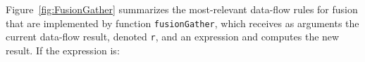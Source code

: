 \documentclass{sigplanconf}  %
\newcommand{\emp}[1]{\textcolor{DikuRed}{ #1}}
\newcommand{\emphh}[1]{\textcolor{CosGreen}{ #1}}
\begin{document}



Figure~\ref{fig:FusionGather} summarizes the most-relevant data-flow rules
for fusion that are implemented by function {\tt fusionGather}, which receives
as arguments the current data-flow result, denoted {\tt r}, and an expression
and computes the new result.  If the expression is:
\end{document}
